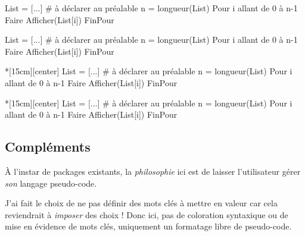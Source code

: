 \documentclass{article}
\begin{document}
\medskip

\begin{codetex}
\begin{envpseudocode} %
List = [...]          # à déclarer au préalable
n = longueur(List)
Pour i allant de 0 à n-1 Faire
	Afficher(List[i])
FinPour
\end{envpseudocode}
\end{codetex}

\smallskip

\begin{codesortie}
\begin{envpseudocode}
List = [...]          # à déclarer au préalable
n = longueur(List)
Pour i allant de 0 à n-1 Faire
	Afficher(List[i])
FinPour
\end{envpseudocode}
\end{codesortie}

\medskip

\begin{codetex}
\begin{envpseudocode}*[15cm][center] %
List = [...]          # à déclarer au préalable
n = longueur(List)
Pour i allant de 0 à n-1 Faire
	Afficher(List[i])
FinPour
\end{envpseudocode}
\end{codetex}

\smallskip

\begin{codesortie}
\begin{envpseudocode}*[15cm][center]
List = [...]          # à déclarer au préalable
n = longueur(List)
Pour i allant de 0 à n-1 Faire
	Afficher(List[i])
FinPour
\end{envpseudocode}
\end{codesortie}

\subsection{Compléments}

\begin{codeinfo}
À l'instar de packages existants, la \textit{philosophie} ici est de laisser l'utilisateur gérer \textit{son} langage pseudo-code.

J'ai fait le choix de ne pas définir des \textsf{mots clés} à mettre en valeur car cela reviendrait à \textit{imposer} des choix ! Donc ici, pas de coloration syntaxique ou de mise en évidence de mots clés, uniquement un formatage libre de pseudo-code.
\end{codeinfo}
\end{document}

